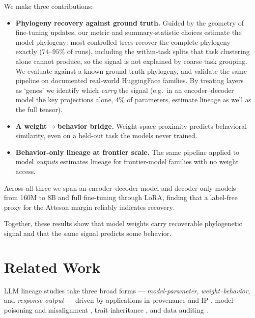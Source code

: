 \documentclass{article}
\theoremstyle{definition}
\theoremstyle{plain}
\begin{document}
We make three contributions:
\begin{itemize}[leftmargin=1.3em,itemsep=1pt,topsep=2pt,parsep=0pt]
  \item \textbf{Phylogeny recovery against ground truth.} Guided by the geometry of
    fine-tuning updates, our metric and summary-statistic choices estimate the model phylogeny:
    most controlled trees recover the complete phylogeny exactly ($74$--$95\%$ of
    runs), including the within-task splits that task clustering alone cannot produce, so the signal is
    not explained by coarse task grouping. We evaluate against a
    known ground-truth phylogeny, and validate the same pipeline on documented real-world
    HuggingFace families. By treating layers as `genes' we identify which \emph{carry} the signal (e.g.\
    in an encoder--decoder model the key projections alone, $4\%$ of parameters, estimate lineage as
    well as the full tensor).
  \item \textbf{A weight$\to$behavior bridge.} Weight-space proximity predicts behavioral similarity,
    even on a held-out task the models never trained.
  \item \textbf{Behavior-only lineage at frontier scale.} The same pipeline applied to model
    \emph{outputs} estimates lineage for frontier-model families with no weight access.
\end{itemize}
Across all three we span an encoder--decoder model and decoder-only models from 160M to 8B and full
fine-tuning through LoRA, finding that a label-free proxy for the Atteson margin reliably indicates
recovery.

Together, these results show that model weights carry recoverable phylogenetic signal and that the
same signal predicts some behavior.







\section{Related Work}
\label{sec:related}

LLM lineage studies take three broad forms --- \emph{model-parameter}, \emph{weight--behavior}, and
\emph{response-output} --- driven by applications in provenance and IP
\citep{horwitz2025mother, zeng2024huref, nikolic2026model}, model poisoning and misalignment
\citep{cloud2025subliminal}, trait inheritance \citep{cloud2025subliminal, agents2026same}, and data
auditing \citep{zhu2025independence}.
\end{document}
